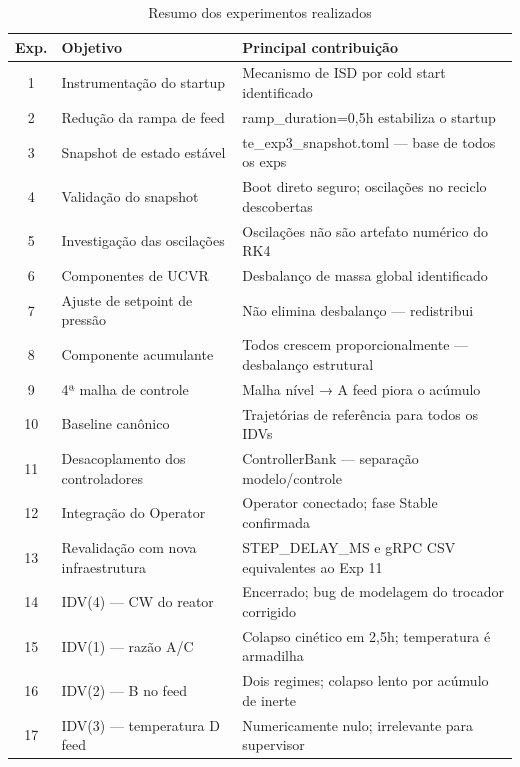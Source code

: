 \begin{table}[ht!]
\centering
\caption{Resumo dos experimentos realizados}
\label{tab:experimentos_resumo}
\begin{tabular}{|c|l|l|}
\hline
\textbf{Exp.} & \textbf{Objetivo}                             & \textbf{Principal contribuição}                        \\
\hline
1  & Instrumentação do startup              & Mecanismo de ISD por cold start identificado           \\
2  & Redução da rampa de feed               & ramp\_duration=0,5h estabiliza o startup               \\
3  & Snapshot de estado estável             & te\_exp3\_snapshot.toml — base de todos os exps        \\
4  & Validação do snapshot                  & Boot direto seguro; oscilações no reciclo descobertas  \\
5  & Investigação das oscilações            & Oscilações não são artefato numérico do RK4            \\
6  & Componentes de UCVR                    & Desbalanço de massa global identificado                \\
7  & Ajuste de setpoint de pressão          & Não elimina desbalanço — redistribui                   \\
8  & Componente acumulante                  & Todos crescem proporcionalmente — desbalanço estrutural \\
9  & 4ª malha de controle                   & Malha nível → A feed piora o acúmulo                   \\
10 & Baseline canônico                      & Trajetórias de referência para todos os IDVs           \\
11 & Desacoplamento dos controladores       & ControllerBank — separação modelo/controle             \\
12 & Integração do Operator                 & Operator conectado; fase Stable confirmada             \\
13 & Revalidação com nova infraestrutura    & STEP\_DELAY\_MS e gRPC CSV equivalentes ao Exp 11      \\
14 & IDV(4) — CW do reator                  & Encerrado; bug de modelagem do trocador corrigido      \\
15 & IDV(1) — razão A/C                     & Colapso cinético em 2,5h; temperatura é armadilha      \\
16 & IDV(2) — B no feed                     & Dois regimes; colapso lento por acúmulo de inerte      \\
17 & IDV(3) — temperatura D feed            & Numericamente nulo; irrelevante para supervisor        \\
\hline
\end{tabular}
\end{table}

